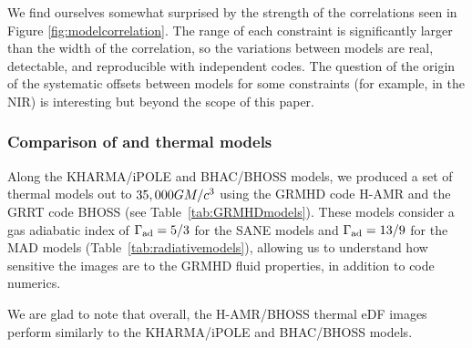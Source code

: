 We find ourselves somewhat surprised by the strength of the correlations seen in Figure \ref{fig:modelcorrelation}.  The range of each constraint is significantly larger than the width of the correlation, so the variations between models are real, detectable, and reproducible with independent codes.  The question of the origin of the systematic offsets between models for some constraints (for example, in the NIR) is interesting but beyond the scope of this paper.   


\subsubsection{Comparison of \hamr and \kharma thermal models}

Along the KHARMA/iPOLE and BHAC/BHOSS models, we produced a set of thermal models out to $35,000GM/c^3$ using the GRMHD code H-AMR and the GRRT code BHOSS (see Table~\ref{tab:GRMHDmodels}). These models consider a gas adiabatic index of $\Gamma_{\rm ad}=5/3$ for the SANE models and $\Gamma_{\rm ad}=13/9$ for the MAD models (Table~\ref{tab:radiativemodels}), allowing us to understand how sensitive the images are to the GRMHD fluid properties, in addition to code numerics. 

We are glad to note that overall, the H-AMR/BHOSS thermal eDF images perform similarly to the KHARMA/iPOLE and BHAC/BHOSS models. 

